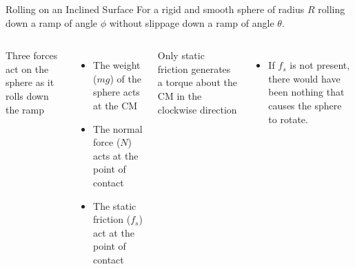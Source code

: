 \documentclass[12pt,compress,aspectratio=169]{beamer}
\begin{document}
\begin{frame}{Rolling on an Inclined Surface}
  For a rigid and smooth sphere of radius $R$ rolling down a ramp of angle
  $\phi$ without slippage down a ramp of angle $\theta$.

  \vspace{.2in}
  \begin{columns}

    Three forces act on the sphere as it rolls down the ramp
    \begin{itemize}
    \item The weight ($mg$) of the sphere acts at the CM
    \item The normal force ($N$) acts at the point of contact
    \item The static friction ($f_s$) act at the point of contact
    \end{itemize}
    Only static friction generates a torque about the CM in the clockwise
    direction
    \begin{itemize}
    \item If $f_s$ is not present, there would have been nothing that causes
      the sphere to rotate.
    \end{itemize}
  \end{columns}
\end{frame}
\end{document}
